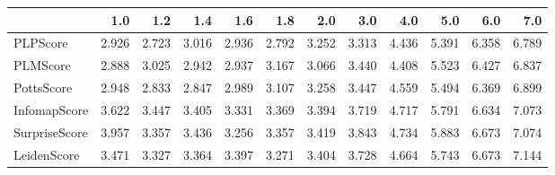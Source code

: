 \begin{tabular}{lrrrrrrrrrrr}
\toprule
{} &   1.0 &   1.2 &   1.4 &   1.6 &   1.8 &   2.0 &   3.0 &   4.0 &   5.0 &   6.0 &   7.0 \\
\midrule
PLPScore      & 2.926 & 2.723 & 3.016 & 2.936 & 2.792 & 3.252 & 3.313 & 4.436 & 5.391 & 6.358 & 6.789 \\
PLMScore      & 2.888 & 3.025 & 2.942 & 2.937 & 3.167 & 3.066 & 3.440 & 4.408 & 5.523 & 6.427 & 6.837 \\
PottsScore    & 2.948 & 2.833 & 2.847 & 2.989 & 3.107 & 3.258 & 3.447 & 4.559 & 5.494 & 6.369 & 6.899 \\
InfomapScore  & 3.622 & 3.447 & 3.405 & 3.331 & 3.369 & 3.394 & 3.719 & 4.717 & 5.791 & 6.634 & 7.073 \\
SurpriseScore & 3.957 & 3.357 & 3.436 & 3.256 & 3.357 & 3.419 & 3.843 & 4.734 & 5.883 & 6.673 & 7.074 \\
LeidenScore   & 3.471 & 3.327 & 3.364 & 3.397 & 3.271 & 3.404 & 3.728 & 4.664 & 5.743 & 6.673 & 7.144 \\
\bottomrule
\end{tabular}
